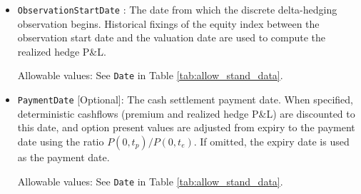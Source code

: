 \begin{itemize}
\begin{itemize}
  \item \lstinline!Name! :  The identifier of the underlying equity or equity index.

    Allowable values: See \lstinline!Name! for equity trades in Table~\ref{tab:equity_name}.

  \item \lstinline!Currency! :  The payment currency.

    Allowable values: See \lstinline!Currency! in Table~\ref{tab:allow_stand_data}.

  \item \lstinline!Strike! :  The option strike price.

    Allowable values: any positive real number.

  \item \lstinline!StrikeCurrency! [Optional]:  The currency of the strike.

    Allowable values: See \lstinline!Currency! in Table~\ref{tab:allow_stand_data}.

  \item \lstinline!Quantity! :  The number of underlying options in this batch ($N^i$).

    Allowable values: any positive real number.

  \end{itemize}

\item \lstinline!ObservationStartDate! :  The date from which the discrete
  delta-hedging observation begins.  Historical fixings of the equity index between the
  observation start date and the valuation date are used to compute the realized hedge P\&L.

  Allowable values: See \lstinline!Date! in Table \ref{tab:allow_stand_data}.

\item \lstinline!PaymentDate! [Optional]:  The cash settlement payment date.  When
  specified, deterministic cashflows (premium and realized hedge P\&L) are discounted to
  this date, and option present values are adjusted from expiry to the payment date using
  the ratio $P(0,t_p)/P(0,t_e)$.  If omitted, the expiry date is used as the payment date.

  Allowable values: See \lstinline!Date! in Table \ref{tab:allow_stand_data}.

\end{itemize}
